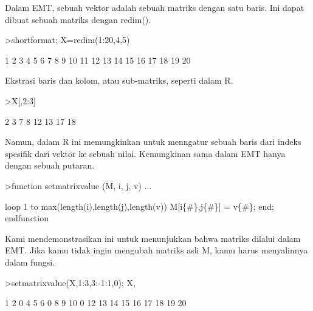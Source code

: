 \documentclass[a4paper,10pt]{article}
\begin{document}
\begin{eulernotebook}
\begin{eulercomment}
\begin{eulercomment}
\begin{eulercomment}
\begin{eulercomment}
\begin{eulercomment}
Dalam EMT, sebuah vektor adalah sebuah matriks dengan satu baris. Ini
dapat dibuat sebuah matriks dengan redim().
\end{eulercomment}
\begin{eulerprompt}
>shortformat; X=redim(1:20,4,5)
\end{eulerprompt}
\begin{euleroutput}
          1         2         3         4         5 
          6         7         8         9        10 
         11        12        13        14        15 
         16        17        18        19        20 
\end{euleroutput}
\begin{eulercomment}
Ekstrasi baris dan kolom, atau sub-matriks, seperti dalam R.
\end{eulercomment}
\begin{eulerprompt}
>X[,2:3]
\end{eulerprompt}
\begin{euleroutput}
          2         3 
          7         8 
         12        13 
         17        18 
\end{euleroutput}
\begin{eulercomment}
Namun, dalam R ini memungkinkan untuk menngatur sebuah baris dari
indeks spesifik dari vektor ke sebuah nilai. Kemungkinan sama dalam
EMT hanya dengan sebuah putaran.
\end{eulercomment}
\begin{eulerprompt}
>function setmatrixvalue (M, i, j, v) ...
\end{eulerprompt}
\begin{eulerudf}
  loop 1 to max(length(i),length(j),length(v))
     M[i\{#\},j\{#\}] = v\{#\};
  end;
  endfunction
\end{eulerudf}
\begin{eulercomment}
Kami mendemonstrasikan ini untuk menunjukkan bahwa matriks dilalui
dalam EMT. Jika kamu tidak ingin mengubah matriks asli M, kamu harus
menyalinnya dalam fungsi.
\end{eulercomment}
\begin{eulerprompt}
>setmatrixvalue(X,1:3,3:-1:1,0); X,
\end{eulerprompt}
\begin{euleroutput}
          1         2         0         4         5 
          6         0         8         9        10 
          0        12        13        14        15 
         16        17        18        19        20 
\end{euleroutput}
\begin{eulercomment}

\end{eulercomment}
\end{eulercomment}
\end{eulercomment}
\end{eulercomment}
\end{eulercomment}
\end{eulernotebook}
\end{document}
